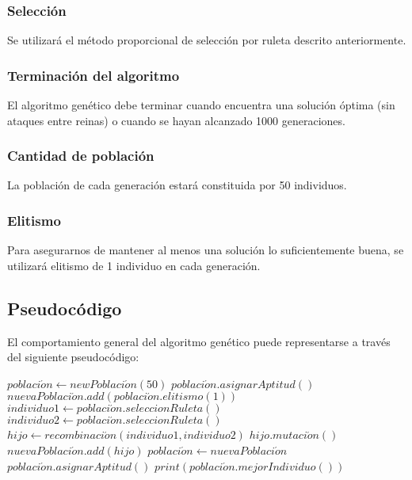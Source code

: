 \subsubsection{Selecci\'on}

Se utilizará el método proporcional de selección por ruleta descrito anteriormente.

\subsubsection{Terminaci\'on del algoritmo}

El algoritmo genético debe terminar cuando encuentra una solución óptima (sin ataques entre reinas) o cuando se hayan alcanzado 1000 generaciones.

\subsubsection{Cantidad de poblaci\'on}

La población de cada generación estará constituida por 50 individuos.

\subsubsection{Elitismo}

Para asegurarnos de mantener al menos una solución lo suficientemente buena, se utilizará elitismo de 1 individuo en cada generación.

\subsection{Pseudoc\'odigo}

El comportamiento general del algoritmo genético puede representarse a través del siguiente pseudocódigo:\medskip

\begin{algorithmic}
  \State $poblaci\acute{o}n\gets new Poblaci\acute{o}n(50)$
  \State $poblaci\acute{o}n.asignarAptitud()$
    \State $nuevaPoblaci\acute{o}n.add(poblaci\acute{o}n.elitismo(1))$
      \State $individuo1\gets poblaci\acute{o}n.seleccionRuleta()$
      \State $individuo2\gets poblaci\acute{o}n.seleccionRuleta()$
      \State $hijo\gets recombinaci\acute{o}n(individuo1, individuo2)$
      \State $hijo.mutaci\acute{o}n()$
      \State $nuevaPoblaci\acute{o}n.add(hijo)$
    \EndWhile
    \State $poblaci\acute{o}n\gets nuevaPoblaci\acute{o}n$
    \State $poblaci\acute{o}n.asignarAptitud()$
  \EndWhile
  \State $print(poblaci\acute{o}n.mejorIndividuo())$
\end{algorithmic}

